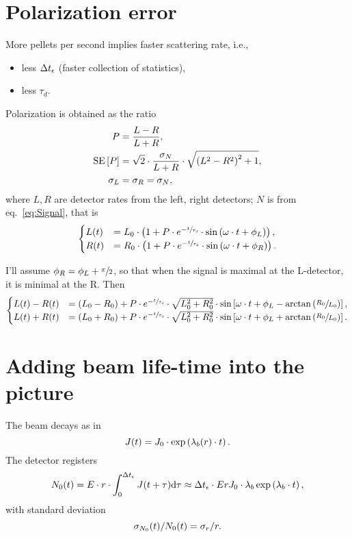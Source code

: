 \documentclass{article}
\begin{document}
\section{Polarization error}
More pellets per second implies faster scattering rate, i.e.,
\begin{itemize}
	\item less $\Delta t_{\epsilon}$ (faster collection of statistics),
	\item less $\tau_d$.
\end{itemize}

Polarization is obtained as the ratio
\begin{align*}
	P	&= \frac{L-R}{L+R}, \\
	\SE{P}	&= \sqrt{2}\cdot \frac{\SD{N}}{L+R}\cdot\sqrt{\bkt{L^2-R^2}^2+1}, \\
	\SD{L} &= \SD{R} = \SD{N},
\end{align*}
where $L,R$ are detector rates from the left, right detectors; $N$ is from eq.~\eqref{eq:Signal}, that is
\newcommand{\sgl}[1]{
	{#1}_0\cdot\bkt{1 + P\cdot e^{-\sfrac{t}{\tau_d}}\cdot\sin\bkt{\omega\cdot t+\phi_{#1}}}
}
\begin{equation}
	\begin{cases}
		L(t) &= \sgl{L}, \\
		R(t) &= \sgl{R}.
	\end{cases}
\end{equation}

I'll assume $\phi_R = \phi_L + \sfrac{\pi}{2}$, so that when the signal is maximal at the L-detector, it is minimal at the R. Then
\begin{equation}
	\begin{cases}
		L(t)-R(t)	&= (L_0-R_0) + P\cdot e^{-\sfrac{t}{\tau_d}}\cdot\sqrt{L_0^2+R_0^2}\cdot\sin\bkt*{\omega\cdot t + \phi_L - \arctan\bkt{\sfrac{R_0}{L_0}}}, \\
		L(t)+R(t)	&= (L_0+R_0) + P\cdot e^{-\sfrac{t}{\tau_d}}\cdot\sqrt{L_0^2+R_0^2}\cdot\sin\bkt*{\omega\cdot t + \phi_L + \arctan\bkt{\sfrac{R_0}{L_0}}}.
	\end{cases}
\end{equation}

\section{Adding beam life-time into the picture}
\newcommand{\lamb}{\lambda_b}
\newcommand{\dtm}{\dt_{\meas}}
The beam decays as in
\[
	J(t) = J_0 \cdot \exp\bkt{\lamb(r)\cdot t}.
\]
The detector registers
\[
	N_0(t) = E\cdot r\cdot \int_{0}^{\dtm} J(t+\tau)\td\tau \approx \dtm\cdot ErJ_0\cdot\lamb\exp\bkt{\lamb\cdot t},
\]
with standard deviation
\[
	\SD{N_0}(t)/N_0(t) = \SD{r}/r.
\]
\end{document}
